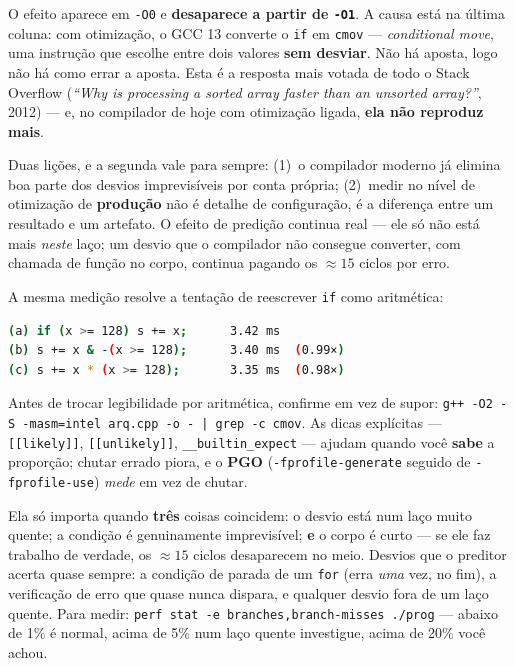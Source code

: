 O efeito aparece em \texttt{-O0} e \textbf{desaparece a partir de \texttt{-O1}}. A
causa está na última coluna: com otimização, o GCC 13 converte o \texttt{if} em
\texttt{cmov} --- \emph{conditional move}, uma instrução que escolhe entre dois
valores \textbf{sem desviar}. Não há aposta, logo não há como errar a aposta. Esta
é a resposta mais votada de todo o Stack Overflow (\emph{``Why is processing a
sorted array faster than an unsorted array?''}, 2012) --- e, no compilador de hoje
com otimização ligada, \textbf{ela não reproduz mais}.

\begin{regra}
Duas lições, e a segunda vale para sempre: (1)~o compilador moderno já elimina boa
parte dos desvios imprevisíveis por conta própria; (2)~medir no nível de
otimização de \textbf{produção} não é detalhe de configuração, é a diferença entre
um resultado e um artefato. O efeito de predição continua real --- ele só não está
mais \emph{neste} laço; um desvio que o compilador não consegue converter, com
chamada de função no corpo, continua pagando os ${\approx}15$ ciclos por erro.
\end{regra}

A mesma medição resolve a tentação de reescrever \texttt{if} como aritmética:

\begin{lstlisting}[style=bt, language=bash,
    caption={Saída de \texttt{src/performance/}: as três formas são a mesma coisa,
             porque o compilador já fazia.}]
(a) if (x >= 128) s += x;      3.42 ms
(b) s += x & -(x >= 128);      3.40 ms  (0.99×)
(c) s += x * (x >= 128);       3.35 ms  (0.98×)
\end{lstlisting}

Antes de trocar legibilidade por aritmética, confirme em vez de supor:
\texttt{g++ -O2 -S -masm=intel arq.cpp -o - | grep -c cmov}. As dicas explícitas
--- \texttt{[[likely]]}, \texttt{[[unlikely]]}, \texttt{\_\_builtin\_expect} ---
ajudam quando você \textbf{sabe} a proporção; chutar errado piora, e o \textbf{PGO}
(\texttt{-fprofile-generate} seguido de \texttt{-fprofile-use}) \emph{mede} em vez
de chutar.

\begin{armadilha}
Ela só importa quando \textbf{três} coisas coincidem: o desvio está num laço muito
quente; a condição é genuinamente imprevisível; \textbf{e} o corpo é curto --- se
ele faz trabalho de verdade, os ${\approx}15$ ciclos desaparecem no meio. Desvios
que o preditor acerta quase sempre: a condição de parada de um \texttt{for} (erra
\emph{uma} vez, no fim), a verificação de erro que quase nunca dispara, e qualquer
desvio fora de um laço quente. Para medir: \texttt{perf stat -e
branches,branch-misses ./prog} --- abaixo de 1\% é normal, acima de 5\% num laço
quente investigue, acima de 20\% você achou.
\end{armadilha}

